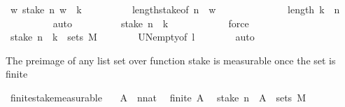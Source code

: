 \begin{isabellebody}
\ {\isachardoublequoteopen}{\isasymAnd}w{\isachardot}{\kern0pt}\ stake\ n\ w\ {\isasymnoteq}\ k{\isachardoublequoteclose}\isanewline
\ \ \ \ \ \ \ \ \isamarkupfalse%
\ length{\isacharunderscore}{\kern0pt}stake{\isacharbrackleft}{\kern0pt}of\ n\ \ w{\isacharbrackright}{\kern0pt}\isanewline
\ \ \ \ \ \ \ \ \ \ \ \ \ \ {\isacartoucheopen}length\ k\ {\isacharless}{\kern0pt}\ n{\isacartoucheclose}\isanewline
\ \ \ \ \ \ \ \ \isamarkupfalse%
\ auto\isanewline
\ \ \ \ \ \ \isamarkupfalse%
\ \isamarkupfalse%
\ {\isachardoublequoteopen}stake\ n\ {\isacharminus}{\kern0pt}{\isacharbackquote}{\kern0pt}\ {\isacharbraceleft}{\kern0pt}k{\isacharbraceright}{\kern0pt}\ {\isacharequal}{\kern0pt}\ {\isacharbraceleft}{\kern0pt}{\isacharbraceright}{\kern0pt}{\isachardoublequoteclose}\isanewline
\ \ \ \ \ \ \ \ \isamarkupfalse%
\ force\isanewline
\ \ \ \ \isamarkupfalse%
\isanewline
\ \ \ \ \isamarkupfalse%
\ \isamarkupfalse%
\ {\isachardoublequoteopen}{\isacharparenleft}{\kern0pt}stake\ n\ {\isacharminus}{\kern0pt}{\isacharbackquote}{\kern0pt}\ {\isacharbraceleft}{\kern0pt}k{\isacharbraceright}{\kern0pt}{\isacharparenright}{\kern0pt}\ {\isasymin}\ sets\ M{\isachardoublequoteclose}\isanewline
\ \ \ \ \ \ \isamarkupfalse%
\ UN{\isacharunderscore}{\kern0pt}empty{}{\isacharbrackleft}{\kern0pt}of\ l{\isacharbrackright}{\kern0pt}\isanewline
\ \ \ \ \ \ \isamarkupfalse%
\ auto\isanewline
\ \ \isamarkupfalse%
%
\endisatagproof
{\isafoldproof}%
%
\isadelimproof
%
\endisadelimproof
%
\begin{isamarkuptext}%
The preimage of any list set over function stake is measurable once the set is finite%
\end{isamarkuptext}\isamarkuptrue%
\isamarkupfalse%
\ finite{\isacharunderscore}{\kern0pt}stake{\isacharunderscore}{\kern0pt}measurable{\isacharcolon}{\kern0pt}\isanewline
\ \ \ A\ \ n{\isacharcolon}{\kern0pt}{\isacharcolon}{\kern0pt}nat\isanewline
\ \ finite\ A{\isachardoublequoteclose}\isanewline
\ \ stake\ n\ {\isacharminus}{\kern0pt}{\isacharbackquote}{\kern0pt}\ A{\isacharparenright}{\kern0pt}\ {\isasymin}\ sets\ M{\isachardoublequoteclose}\isanewline
%
\isadelimproof
%
\endisadelimproof
%
\isatagproof
{}\isamarkupfalse%
{\isacharminus}{\kern0pt}\isanewline

\end{isabellebody}
